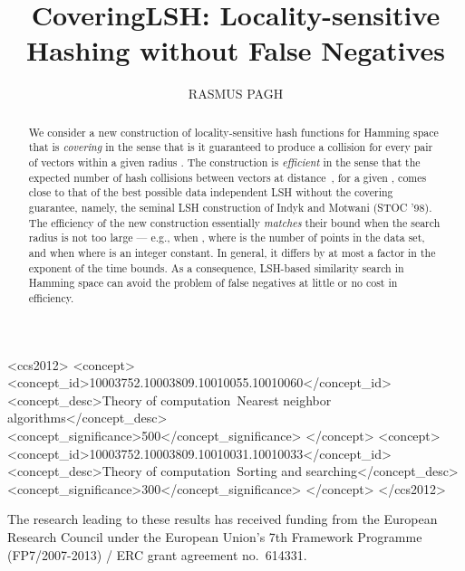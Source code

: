 \documentclass[prodmode,acmtalg]{acmsmall}
\begin{document}

\title{CoveringLSH: Locality-sensitive Hashing without False Negatives}
\author{RASMUS PAGH
}

\begin{abstract}
We consider a new construction of locality-sensitive hash functions for Hamming space that is \emph{covering} in the sense that is it guaranteed to produce a collision for every pair of vectors within a given radius . 
The construction is \emph{efficient} in the sense that the expected number of hash collisions between vectors at distance~, for a given , comes close to that of the best possible data independent LSH without the covering guarantee, namely, the seminal LSH construction of Indyk and Motwani (STOC '98).
The efficiency of the new construction essentially \emph{matches} their bound when the search radius is not too large --- e.g., when , where  is the number of points in the data set, and when  where  is an integer constant.
In general, it differs by at most a factor  in the exponent of the time bounds. 
As a consequence, LSH-based similarity search in Hamming space can avoid the problem of false negatives at little or no cost in efficiency.
\end{abstract}

\begin{CCSXML}
<ccs2012>
<concept>
<concept_id>10003752.10003809.10010055.10010060</concept_id>
<concept_desc>Theory of computation~Nearest neighbor algorithms</concept_desc>
<concept_significance>500</concept_significance>
</concept>
<concept>
<concept_id>10003752.10003809.10010031.10010033</concept_id>
<concept_desc>Theory of computation~Sorting and searching</concept_desc>
<concept_significance>300</concept_significance>
</concept>
</ccs2012>
\end{CCSXML}







\begin{bottomstuff}
The research leading to these results has received funding from the European Research Council under the European Union’s 7th Framework Programme (FP7/2007-2013) / ERC grant agreement no.~614331.
\end{bottomstuff}
\end{document}
